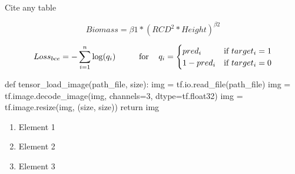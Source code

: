 Cite any table 


\begin{equation}
  Biomass = \beta 1 * {({RCD}^2 * Height)}^{\beta 2}  
\end{equation}

\begin{equation}
  Loss_{bce} = -\sum_{i=1}^{n}\log(q_{i})
  \hspace{1cm}
  \text{for } \hspace{0.3cm} q_{i} = 
            \begin{cases} 
                            pred_{i}   & \text{if } target_{i} = 1 \\
                            1-pred_{i} & \text{if } target_{i} = 0
            \end{cases}
\end{equation}

\begin{python}
  def tensor_load_image(path_file, size):
      img = tf.io.read_file(path_file)
      img = tf.image.decode_image(img, channels=3, dtype=tf.float32)
      img = tf.image.resize(img, (size, size))
      return img
  \end{python}


\space\cite{Bolte2006} %
\citep{Keane2015} %


\begin{enumerate}
  \item Element 1
  \item Element 2
  \item Element 3
\end{enumerate}